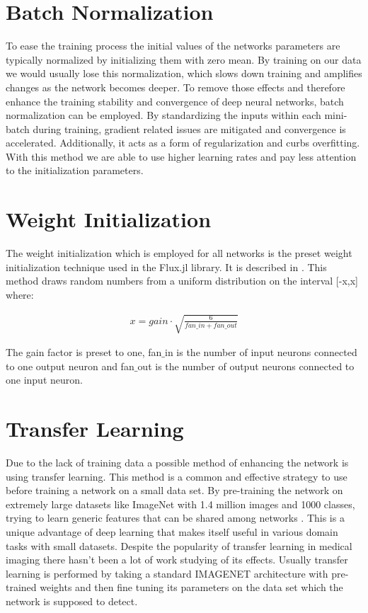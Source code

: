 \documentclass[
a4paper, 
12pt,
grayscalebody, %
abstract=on,
twoside, BCOR10mm, 12pt, DIV13,headinclude, footexclude, final, abstracton, openright
]{ibireprt}
\numberwithin{equation}{chapter}
\numberwithin{table}{chapter}
\numberwithin{figure}{chapter}
\numberwithin{algorithm}{chapter}
\numberwithin{example}{chapter}
\numberwithin{example}{chapter}
\begin{document}
\section{Batch Normalization}
To ease the training process the initial values of the networks parameters are typically normalized by initializing them with zero mean. By training on our data we would usually lose this normalization, which slows down training and amplifies changes as the network becomes deeper. To remove those effects and therefore enhance the training stability and convergence of deep neural networks, batch normalization can be employed. \citet{Ioffe2015} By standardizing the inputs within each mini-batch during training, gradient related issues are mitigated and convergence is  accelerated. Additionally, it acts as a form of regularization and curbs overfitting. With this method we are able to use higher learning rates and pay less attention to the initialization parameters. \citet{Ruder2016} 

\section{Weight Initialization}
The weight initialization which is employed for all networks is the preset weight initialization technique used in the Flux.jl library. It  is described in \citet{glorot2010}. This method draws random numbers from a uniform distribution on the interval [-x,x] where:

\begin{align}
	x = gain \cdot \sqrt{\frac{6}{fan\_in + fan\_out}}
\end{align}  

The gain factor is preset to one, fan$\_$in is the number of input neurons connected to one output neuron and fan$\_$out is the number of output neurons connected to one input neuron.


\section{Transfer Learning}
Due to the lack of training data a possible method of enhancing the network is using transfer learning. This method is a common and effective strategy to use before training a network on a small data set. By pre-training the network on extremely large datasets like ImageNet with 1.4 million images and 1000 classes, trying to learn generic features that can be shared among networks \citep{Yamashita2018}. This is a unique advantage of deep learning that makes itself useful in various domain tasks with small datasets. Despite the popularity of transfer learning in medical imaging there hasn't been a lot of work studying of its effects. Usually transfer learning is performed by taking a standard IMAGENET architecture with pre-trained weights and then fine tuning its parameters on the data set which the network is supposed to detect.
\end{document}
